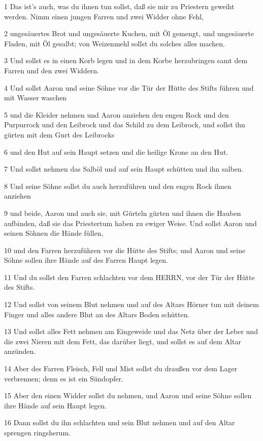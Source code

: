 \par 1 Das ist's auch, was du ihnen tun sollst, daß sie mir zu Priestern geweiht werden. Nimm einen jungen Farren und zwei Widder ohne Fehl,
\par 2 ungesäuertes Brot und ungesäuerte Kuchen, mit Öl gemengt, und ungesäuerte Fladen, mit Öl gesalbt; von Weizenmehl sollst du solches alles machen.
\par 3 Und sollst es in einen Korb legen und in dem Korbe herzubringen samt dem Farren und den zwei Widdern.
\par 4 Und sollst Aaron und seine Söhne vor die Tür der Hütte des Stifts führen und mit Wasser waschen
\par 5 und die Kleider nehmen und Aaron anziehen den engen Rock und den Purpurrock und den Leibrock und das Schild zu dem Leibrock, und sollst ihn gürten mit dem Gurt des Leibrocks
\par 6 und den Hut auf sein Haupt setzen und die heilige Krone an den Hut.
\par 7 Und sollst nehmen das Salböl und auf sein Haupt schütten und ihn salben.
\par 8 Und seine Söhne sollst du auch herzuführen und den engen Rock ihnen anziehen
\par 9 und beide, Aaron und auch sie, mit Gürteln gürten und ihnen die Hauben aufbinden, daß sie das Priestertum haben zu ewiger Weise. Und sollst Aaron und seinen Söhnen die Hände füllen,
\par 10 und den Farren herzuführen vor die Hütte des Stifts; und Aaron und seine Söhne sollen ihre Hände auf des Farren Haupt legen.
\par 11 Und du sollst den Farren schlachten vor dem HERRN, vor der Tür der Hütte des Stifts.
\par 12 Und sollst von seinem Blut nehmen und auf des Altars Hörner tun mit deinem Finger und alles andere Blut an des Altars Boden schütten.
\par 13 Und sollst alles Fett nehmen am Eingeweide und das Netz über der Leber und die zwei Nieren mit dem Fett, das darüber liegt, und sollst es auf dem Altar anzünden.
\par 14 Aber des Farren Fleisch, Fell und Mist sollst du draußen vor dem Lager verbrennen; denn es ist ein Sündopfer.
\par 15 Aber den einen Widder sollst du nehmen, und Aaron und seine Söhne sollen ihre Hände auf sein Haupt legen.
\par 16 Dann sollst du ihn schlachten und sein Blut nehmen und auf den Altar sprengen ringsherum.

